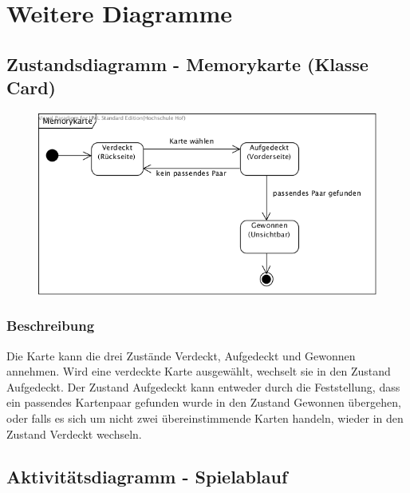 \clearpage

\chapter{Weitere Diagramme}

\section{Zustandsdiagramm - Memorykarte (Klasse Card)}

\begin{figure}[!h]
	\centering
    \includegraphics[width=\textwidth]{./ZD_Memorykarte.png}
	\label{layout_gesamt}
\end{figure}
\subsection{Beschreibung}
Die Karte kann die drei Zustände Verdeckt, Aufgedeckt und Gewonnen annehmen. Wird eine verdeckte Karte ausgewählt, wechselt sie in den Zustand Aufgedeckt. Der Zustand Aufgedeckt kann entweder durch die Feststellung, dass ein passendes Kartenpaar gefunden wurde in den Zustand Gewonnen übergehen, oder falls es sich um nicht zwei übereinstimmende Karten handeln, wieder in den Zustand Verdeckt wechseln.


\clearpage
\section{Aktivitätsdiagramm - Spielablauf}

